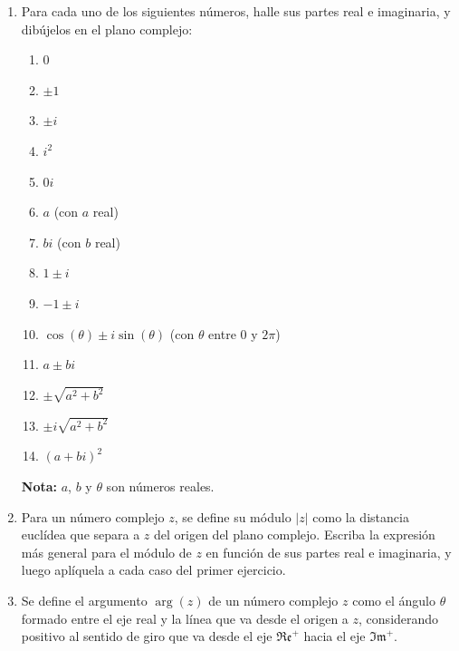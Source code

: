 \documentclass[11pt,spanish]{article}
\begin{document}
\begin{enumerate}


    \item Para cada uno de los siguientes números, halle sus partes real e imaginaria,
    y dibújelos en el plano complejo:

    \begin{enumerate}
        \item $0$
        \item $\pm 1$
        \item $\pm i$
        \item $i^2$
        \item $0 i$
        \item $a$ (con $a$ real)
        \item $b i$ (con $b$ real)
        \item $1 \pm i$
        \item $-1 \pm i$
        \item $\cos(\theta) \pm i \sin(\theta)$ (con $\theta$ entre $0$ y $2 \pi$) 
        \item $a \pm bi$ 
        \item $\pm \sqrt {a^2 + b^2}$
        \item $\pm i \sqrt {a^2 + b^2}$
        \item $ (a + bi)^2 $
    \end{enumerate}

    \textbf{Nota:} $a$, $b$ y $\theta$ son números reales.


    \item Para un número complejo $z$, se define su módulo $|z|$ como la distancia euclídea que separa a $z$ del origen del plano complejo. Escriba la expresión más general para el módulo de $z$ en función de sus partes real e imaginaria, y luego aplíquela a cada caso del primer ejercicio.


    \item Se define el argumento $\arg(z)$ de un número complejo $z$ como el ángulo $\theta$ formado entre el eje real y la línea que va desde el origen a $z$, considerando positivo al sentido de giro que va desde el eje $\mathfrak{Re}^+$ hacia el eje $\mathfrak{Im}^+$.


\end{enumerate}
\end{document}
